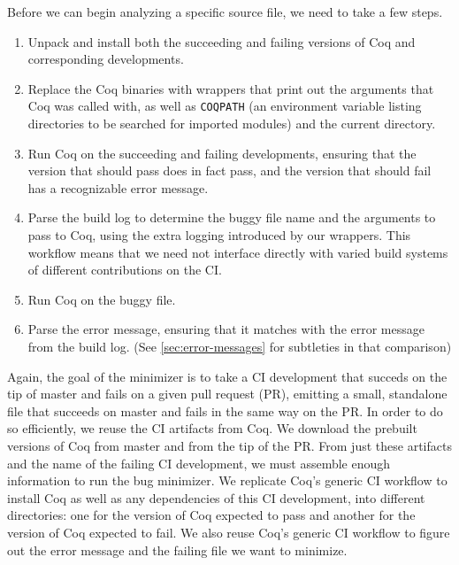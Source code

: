 \documentclass[a4paper,USenglish,cleveref,autoref,thm-restate]{lipics-v2021}
\begin{document}
Before we can begin analyzing a specific source file, we need to take a few steps.
\begin{enumerate}
\item Unpack and install both the succeeding and failing versions of Coq and corresponding developments.
\item Replace the Coq binaries with wrappers that print out the arguments that Coq was called with, as well as \texttt{COQPATH} (an environment variable listing directories to be searched for imported modules) and the current directory.
\item Run Coq on the succeeding and failing developments, ensuring that the version that should pass does in fact pass, and the version that should fail has a recognizable error message.
\item Parse the build log to determine the buggy file name and the arguments to pass to Coq, using the extra logging introduced by our wrappers.
  This workflow means that we need not interface directly with varied build systems of different contributions on the CI.
\item Run Coq on the buggy file.
\item Parse the error message, ensuring that it matches with the error message from the build log.
  (See \autoref{sec:error-messages} for subtleties in that comparison)
\end{enumerate}

Again, the goal of the minimizer is to take a CI development that succeds on the tip of master and fails on a given pull request (PR), emitting a small, standalone file that succeeds on master and fails in the same way on the PR.
In order to do so efficiently, we reuse the CI artifacts from Coq.
We download the prebuilt versions of Coq from master and from the tip of the PR.
From just these artifacts and the name of the failing CI development, we must assemble enough information to run the bug minimizer.
We replicate Coq's generic CI workflow to install Coq as well as any dependencies of this CI development, into different directories: one for the version of Coq expected to pass and another for the version of Coq expected to fail.
We also reuse Coq's generic CI workflow to figure out the error message and the failing file we want to minimize.
\end{document}
